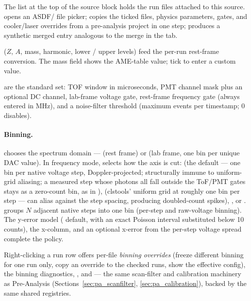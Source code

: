 The  list at the top of the source block holds the run
files attached to this source.  opens an
ASDF/ file picker;  copies
the ticked files, physics parameters, gates, and cooler/laser
overrides from a pre-analysis project in one step;
 produces a synthetic merged entry analogous to
the merge in the  tab.

 ($Z$, $A$, mass, harmonic, lower / upper
levels) feed the per-run rest-frame conversion. The mass field shows
the AME-table value; tick  to enter a custom value.

 are the standard set: TOF window in microseconds, PMT
channel mask plus an optional DC channel, lab-frame voltage gate,
rest-frame frequency gate (always entered in MHz), and a noise-filter
threshold (maximum events per timestamp; 0 disables).

\paragraph{Binning.}
 chooses the spectrum domain ---  (rest
frame) or  (lab frame, one bin per unique DAC
value). In frequency mode,  selects how the axis
is cut:  (the default --- one bin per native
voltage step, Doppler-projected; structurally immune to
uniform-grid aliasing; a measured step whose photons all fall outside
the ToF/PMT gates stays as a zero-count bin, as in ),
 (clstools' uniform grid at
roughly one bin per step --- can alias against the step spacing,
producing doubled-count spikes), , or
.  groups $N$ adjacent
native steps into one bin (per-step and raw-voltage binning). The
y-error model ( default, with an exact
Poisson interval substituted below 10 counts), the x-column, and an
optional x-error from the per-step voltage spread complete the
policy.

Right-clicking a run row offers per-file \emph{binning overrides}
(freeze different binning for one run only, copy an override to the
checked runs, show the effective config), the binning diagnostics,
, and  --- the same
scan-filter and calibration machinery as Pre-Analysis
(Sections~\ref{sec:pa_scanfilter}, \ref{sec:pa_calibration}), backed
by the same shared registries.

